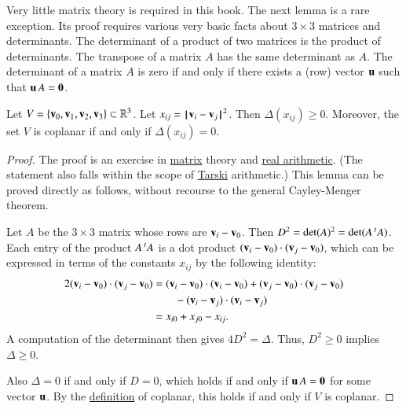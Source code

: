 \begin{background}\label{back:matrix}
  Very little matrix theory is required in this book.  The next lemma
  is a rare exception.  Its proof requires various very basic facts
  about $3\times 3$ matrices and determinants.  The determinant of a
  product of two matrices is the product of determinants.  The
  transpose of a matrix $A$ has the same determinant as $A$.  The
  determinant of a matrix $A$ is zero if and only if there exists a
  (row) vector ${\mathbf u}$ such that ${\mathbf u}\, A = {\mathbf 0}$.
\end{background}

\begin{lemma}[]\label{lemma:delta-pos}
  Let $V=\{{\mathbf v}_0,{\mathbf v}_1,{\mathbf v}_2,{\mathbf v}_3\}\subset\mathbb{R}^3$.  Let $x_{ij} =
  \norm{\v_i}{\v_j}^2$.  Then $\Delta(x_{ij})\ge 0$.  Moreover, the
  set $V$ is coplanar if and only if $\Delta(x_{ij}) = 0$.%
\end{lemma}

\begin{proof} The proof is an exercise in
  \hyperref[back:matrix]{matrix} theory and
  \hyperref[back:analysis]{real arithmetic}.  (The statement also
  falls within the scope of \hyperref[back:tarski]{Tarski}
  arithmetic.)  This lemma can be proved directly as follows, without
  recourse to the general Cayley-Menger theorem.

  Let $A$ be the $3\times 3$ matrix whose rows are ${\mathbf v}_i - {\mathbf v}_0$.  Then
  $D^2 = \det(A)^2 = \det(A \,\hbox{}^t A)$.  Each entry of the
  product $A\,\hbox{}^tA$ is a dot product $({\mathbf v}_i-{\mathbf v}_0)\cdot
  ({\mathbf v}_j-{\mathbf v}_0)$, which can be expressed in terms of the constants
  $x_{ij}$ by the following identity:
\begin{align}\label{eqn:dot-law}
  2 ({\mathbf v}_i-{\mathbf v}_0)\cdot ({\mathbf v}_j-{\mathbf v}_0) 
&= ({\mathbf v}_i-{\mathbf v}_0)\cdot({\mathbf v}_i-{\mathbf v}_0) + ({\mathbf v}_j-{\mathbf v}_0)\cdot ({\mathbf v}_j-{\mathbf v}_0)\nonumber \\
  & \qquad - ({\mathbf v}_i-{\mathbf v}_j)\cdot ({\mathbf v}_i-{\mathbf v}_j)\nonumber\\
&= x_{i0} + x_{j0} - x_{ij}.
\end{align}
A computation of the determinant then gives $4D^2=\Delta$.
Thus, $D^2\ge0$ implies $\Delta\ge 0$.

Also $\Delta=0$ if and only if $D=0$, which holds if and only if ${\mathbf u}\,
A = {\mathbf 0}$ for some vector ${\mathbf u}$.  By the
\hyperref[def:plane]{definition} of coplanar, this holds if and only
if $V$ is coplanar.
\end{proof}

